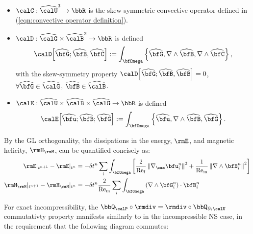\begin{example}
        \begin{itemize}
            \item  $\calC : \widehat{\calU}^{3} \rightarrow \bbR$ is the skew-symmetric convective operator defined in (\ref{eqn:convective operator definition}).
            \item  $\calD : \widehat{\calG}\times\widehat{\calB}^{2} \rightarrow \bbR$ is defined
            \begin{equation}
                \calD\!\left[\widehat{\bfG}; \widehat{\bfB}, \widehat{\bfC}\right]
                :=
                \int_{\bfOmega}\left\{\widehat{\bfG}, \nabla\wedge\widehat{\bfB}, \nabla\wedge\widehat{\bfC}\right\},
            \end{equation}
            with the skew-symmetry property $\calD\!\left[\widehat{\bfG}; \widehat{\bfB}, \widehat{\bfB}\right]  =  0$, $\forall \widehat{\bfG} \in \widehat{\calG}$, $\widehat{\bfB} \in \widehat{\calB}$.
            \item  $\calE : \widehat{\calU}\times\widehat{\calB}\times\widehat{\calG} \rightarrow \bbR$ is defined
            \begin{equation}
                \calE\!\left[\widehat{\bfu}; \widehat{\bfB}; \widehat{\bfG}\right]
                :=
                \int_{\bfOmega}\left\{\widehat{\bfu}, \nabla\wedge\widehat{\bfB}, \widehat{\bfG}\right\}.
            \end{equation}
        \end{itemize}

        By the GL orthogonality, the dissipations in the energy, $\rmE$, and magnetic helicity, $\rmH_{\rmM}$, can be quantified concisely as:
        \begin{align}
                   \rmE|_{t^{n + 1}} -        \rmE|_{t^{n}}  &=  - \delta t^{n}\sum_{i}\int_{\bfOmega}\left[\frac{2}{\rmRef}\left\|\nabla_{\rms}\bfu_{i}^{n}\right\|^{2} + \frac{1}{\rmRem}\left\|\nabla\wedge\bfB_{i}^{n}\right\|^{2}\right]  \\
            \rmH_{\rmM}|_{t^{n + 1}} - \rmH_{\rmM}|_{t^{n}}  &=  - \delta t^{n}\frac{2}{\rmRem}\sum_{i}\int_{\bfOmega}\left(\nabla\wedge\bfG_{i}^{n}\right)\cdot\bfB_{i}^{n}
        \end{align}

        For exact incompressibility, the $\bbQ_{\calP}\circ\rmdiv = \rmdiv\circ\bbQ_{\partial_{t}\calU}$ commutativty property manifests similarly to in the incompressible NS case, in the requirement that the following diagram commutes:
        \begin{center}
\end{center}
\end{example}
